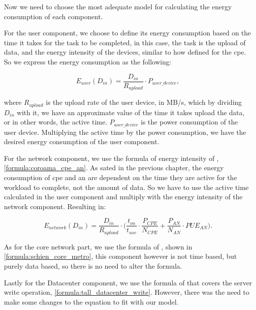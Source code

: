     Now we need to choose the most adequate model for calculating the energy consumption of each component.

    For the user component, we choose to define its energy consumption based on the time it takes for the task to be completed, in this case, the task is the upload of data, and the energy intensity of the devices, similar to how \citet{Coroama2015} defined for the \ac{cpe}. So we express the energy consumption as the following:

    \begin{equation}
        \label{formula:upload_user_energy}
        E_{user}(D_{in}) = \frac{D_{in}}{R_{upload}} \cdot P_{user\_device},
    \end{equation}

    \noindent where $R_{upload}$ is the upload rate of the user device, in MB/s, which by dividing $D_{in}$ with it, we have an approximate value of the time it takes upload the data, or in other words, the active time. $P_{user\_device}$ is the power consumption of the user device. Multiplying the active time by the power consumption, we have the desired energy consumption of the user component.

    For the network component, we use the formula of energy intensity of \citet{Coroama2015}, \ref{formula:coroama_cpe_an}. As sated in the previous chapter, the energy consumption of \ac{cpe} and \ac{an} are dependent on the time they are active for the workload to complete, not the amount of data. So we have to use the active time calculated in the user component and multiply with the energy intensity of the network component. Resulting in:

    \begin{equation}
        \label{formula:upload_network_energy}
        E_{network}(D_{in}) = \frac{D_{in}}{R_{upload}} \cdot \Bigg( \frac{t_{on}}{t_{use}} \cdot \frac{P_{CPE}}{N_{CPE}} + \frac{P_{AN}}{N_{AN}} \cdot PUE_{AN} \Bigg).
    \end{equation}
    
    As for the core network part, we use the formula of \citet{Schien2015}, shown in \ref{formula:schien_core_metro}, this component however is not time based, but purely data based, so there is no need to alter the formula.

    Lastly for the Datacenter component, we use the formula of \citet{Taal2014} that covers the server write operation, \ref{formula:tall_datacenter_write}. However, there was the need to make some changes to the equation to fit with our model.

